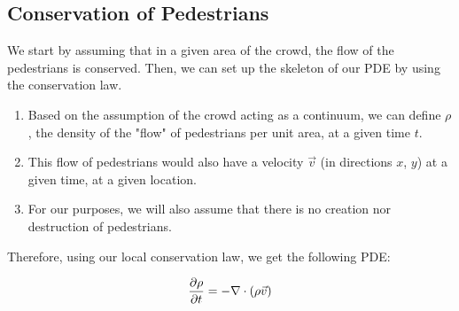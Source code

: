 \documentclass{article}
\begin{document}
\subsection{Conservation of Pedestrians}
We start by assuming that in a given area of the crowd, the flow of the pedestrians is conserved. Then, we can set up the skeleton of our PDE by using the conservation law. 

\begin{enumerate}
    \item Based on the assumption of the crowd acting as a continuum, we can define $\rho$, the density of the "flow" of pedestrians per unit area, at a given time $t$.
    \item This flow of pedestrians would also have a  velocity $\vec{v}$ (in directions $x$, $y$) at a given time, at a given location.
    \item For our purposes, we will also assume that there is no creation nor destruction of pedestrians.
\end{enumerate}

Therefore, using our local conservation law, we get the following PDE:

\begin{equation}
    \diffp \rho t = - \nabla\cdot (\rho\vec v)
\end{equation}
\end{document}
